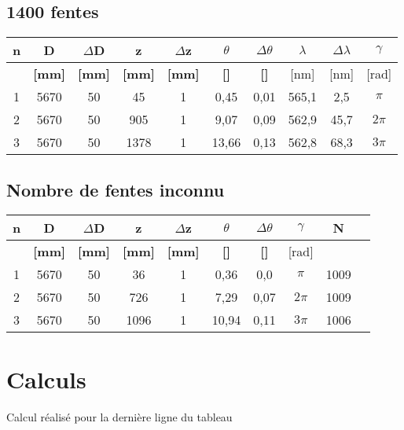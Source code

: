 \documentclass[11pt,a4paper]{report}
\begin{document}
	\subsection{1400 fentes}
	\begin{tabular}{|c|c|c|c|c|c|c|c|c|c|}
		\hline
		\bf n & \bf D & \bf $\Delta$D & \bf z & \bf $\Delta$z & \bf $\theta$ & \bf $\Delta \theta$ & $\lambda$& $\Delta \lambda$&\bf $\gamma$ \\
		\hline
		 & \bf [mm] & \bf [mm] & \bf [mm] & \bf [mm] & \bf [\degre]  & \bf [\degre]  &  [nm] & [nm] & [rad]\\
		\hline
		1 & 5670 & 50 & 45 &   1&0,45&0,01&565,1&2,5&$\pi$\\
		2 & 5670 & 50 & 905 &  1&9,07&0,09&562,9&45,7&$2\pi$\\
		3 & 5670 & 50 & 1378 &  1&13,66&0,13&562,8&68,3&$3\pi$\\
		\hline
	\end{tabular}
	\subsection{Nombre de fentes inconnu}
	\begin{tabular}{|c|c|c|c|c|c|c|c|c|c|}
		\hline
		\bf n & \bf D & \bf $\Delta$D & \bf z & \bf $\Delta$z & \bf $\theta$ & \bf $\Delta \theta$ &\bf $\gamma$ & N\\
		\hline
		 & \bf [mm] & \bf [mm] & \bf [mm] & \bf [mm] & \bf [\degre]  & \bf [\degre]  & [rad] &\\
		\hline
		1 & 5670 & 50 & 36 &   1&0,36& 0,0 &$\pi$&1009\\
		2 & 5670 & 50 & 726 &  1&7,29& 0,07&$2\pi$&1009\\
		3 & 5670 & 50 & 1096 &  1&10,94&0,11 &$3\pi$&1006\\
		\hline
	\end{tabular}
	\section{Calculs}
	Calcul réalisé pour la dernière ligne du tableau
\end{document}
